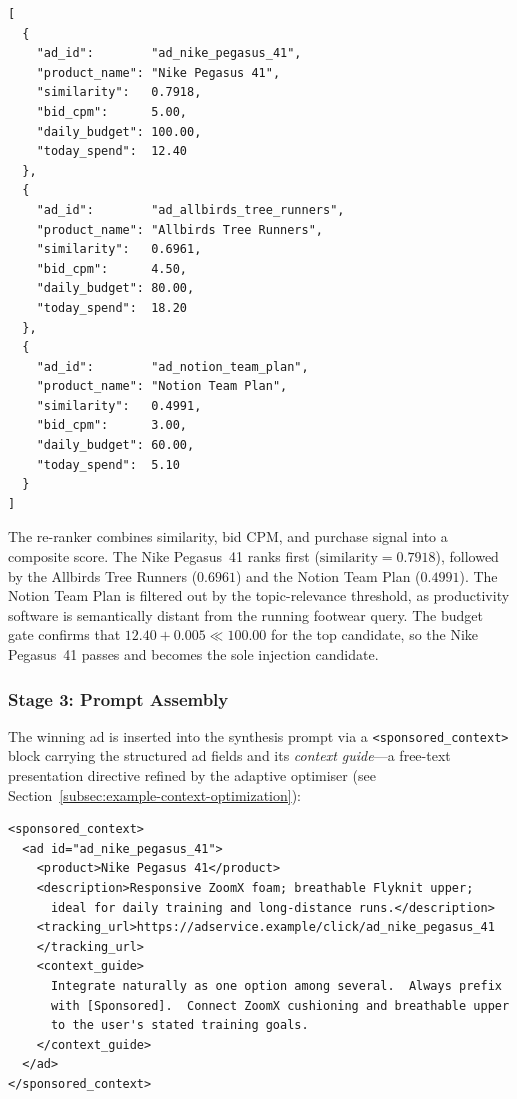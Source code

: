 \begin{lstlisting}[style=jsonstyle, caption={Vector-search candidates returned
by the retrieval stage.}, label={lst:example1-retrieval}]
[
  {
    "ad_id":        "ad_nike_pegasus_41",
    "product_name": "Nike Pegasus 41",
    "similarity":   0.7918,
    "bid_cpm":      5.00,
    "daily_budget": 100.00,
    "today_spend":  12.40
  },
  {
    "ad_id":        "ad_allbirds_tree_runners",
    "product_name": "Allbirds Tree Runners",
    "similarity":   0.6961,
    "bid_cpm":      4.50,
    "daily_budget": 80.00,
    "today_spend":  18.20
  },
  {
    "ad_id":        "ad_notion_team_plan",
    "product_name": "Notion Team Plan",
    "similarity":   0.4991,
    "bid_cpm":      3.00,
    "daily_budget": 60.00,
    "today_spend":  5.10
  }
]
\end{lstlisting}

\noindent
The re-ranker combines similarity, bid CPM, and purchase signal into a
composite score.  The Nike Pegasus~41 ranks first ($\text{similarity}=0.7918$),
followed by the Allbirds Tree Runners ($0.6961$) and the Notion Team Plan
($0.4991$).  The Notion Team Plan is filtered out by the topic-relevance
threshold, as productivity software is semantically distant from the running
footwear query.  The budget gate confirms that
$12.40 + 0.005 \ll 100.00$ for the top candidate, so the Nike Pegasus~41
passes and becomes the sole injection candidate.

\subsubsection{Stage 3: Prompt Assembly}
\label{subsubsec:example1-prompt}

The winning ad is inserted into the synthesis prompt via a
\texttt{<sponsored\_context>} block carrying the structured ad fields and
its \emph{context guide}---a free-text presentation directive refined by the
adaptive optimiser (see Section~\ref{subsec:example-context-optimization}):

\begin{lstlisting}[style=jsonstyle, caption={Sponsored context block injected
into the system prompt.}, label={lst:example1-prompt}]
<sponsored_context>
  <ad id="ad_nike_pegasus_41">
    <product>Nike Pegasus 41</product>
    <description>Responsive ZoomX foam; breathable Flyknit upper;
      ideal for daily training and long-distance runs.</description>
    <tracking_url>https://adservice.example/click/ad_nike_pegasus_41
    </tracking_url>
    <context_guide>
      Integrate naturally as one option among several.  Always prefix
      with [Sponsored].  Connect ZoomX cushioning and breathable upper
      to the user's stated training goals.
    </context_guide>
  </ad>
</sponsored_context>
\end{lstlisting}

